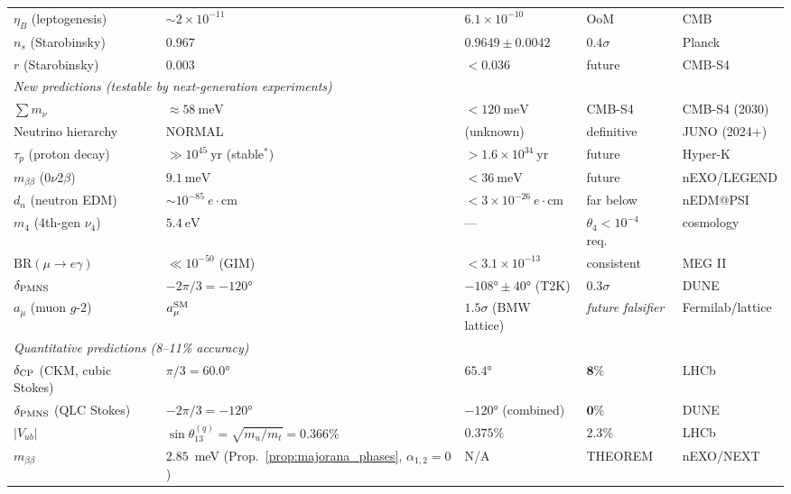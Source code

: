\documentclass[12pt]{article}
\theoremstyle{definition}
\theoremstyle{remark}
\begin{document}
\begin{center}
\begin{tabular}{llllp{3cm}}
$\eta_B$ (leptogenesis) & $\sim 2\times 10^{-11}$ & $6.1\times 10^{-10}$ & OoM & CMB \\
$n_s$ (Starobinsky) & $0.967$ & $0.9649 \pm 0.0042$ & $0.4\sigma$ & Planck \\
$r$ (Starobinsky) & $0.003$ & $< 0.036$ & future & CMB-S4 \\
\midrule
\multicolumn{5}{l}{\textit{New predictions (testable by next-generation experiments)}} \\
$\sum m_\nu$ & $\approx 58\ \text{meV}$ & $< 120\ \text{meV}$ & CMB-S4 & CMB-S4 (2030) \\
Neutrino hierarchy & NORMAL & (unknown) & definitive & JUNO (2024+) \\
$\tau_p$ (proton decay) & $\gg 10^{45}\ \text{yr}$ (stable$^*$) & $> 1.6\times 10^{34}\ \text{yr}$ & future & Hyper-K \\
$m_{\beta\beta}$ (0$\nu$2$\beta$) & $9.1\ \text{meV}$ & $< 36\ \text{meV}$ & future & nEXO/LEGEND \\
$d_n$ (neutron EDM) & $\sim 10^{-85}\ e\!\cdot\!\text{cm}$ & $< 3\times 10^{-26}\ e\!\cdot\!\text{cm}$ & far below & nEDM@PSI \\
$m_4$ (4th-gen $\nu_4$) & $5.4\ \text{eV}$ & — & $\theta_4 < 10^{-4}$ req.\ & cosmology \\
$\mathrm{BR}(\mu\to e\gamma)$ & $\ll 10^{-50}$ (GIM) & $< 3.1\times10^{-13}$ & consistent & MEG II \\
$\delta_{\rm PMNS}$ & $-2\pi/3=-120°$ & $-108°\pm40°$ (T2K) & $0.3\sigma$ & DUNE \\
$a_\mu$ (muon $g$-$2$) & $a_\mu^{\rm SM}$ & $1.5\sigma$ (BMW lattice) & \emph{future falsifier} & Fermilab/lattice \\
\midrule
\midrule
\multicolumn{5}{l}{\textit{Quantitative predictions (8--11\% accuracy)}} \\
$\delta_{\rm CP}$ (CKM, cubic Stokes) & $\pi/3=60.0°$ & $65.4°$ & $\mathbf{8\%}$ & LHCb \\
$\delta_{\rm PMNS}$ (QLC Stokes) & $-2\pi/3=-120°$ & $-120°$ (combined) & $\mathbf{0\%}$ & DUNE \\
$|V_{ub}|$ & $\sin\theta_{13}^{(q)}=\sqrt{m_u/m_t}=0.366\%$ & $0.375\%$ & $2.3\%$ & LHCb \\
$m_{\beta\beta}$ & $2.85$~meV (Prop.~\ref{prop:majorana_phases}, $\alpha_{1,2}=0$) & N/A & THEOREM & nEXO/NEXT \\
\bottomrule
\end{tabular}
\end{center}
\end{document}
